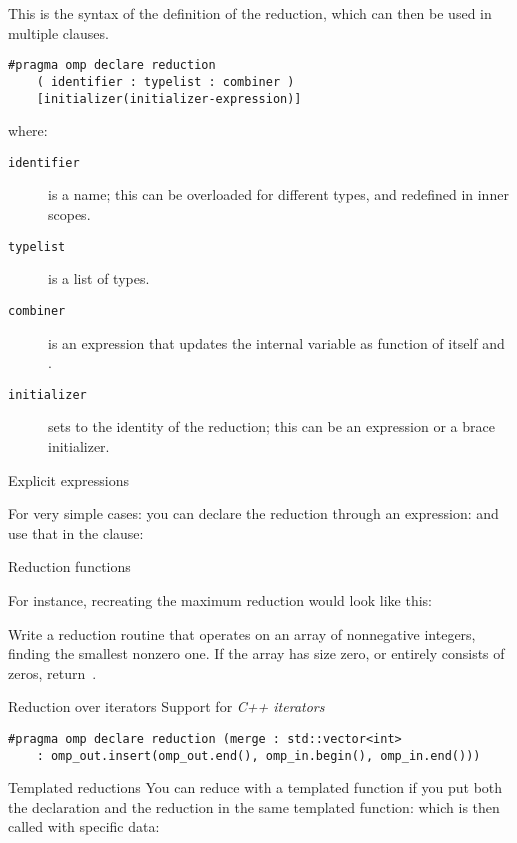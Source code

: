 This is the syntax of the definition of the reduction, which can then
be used in multiple  clauses.
\begin{lstlisting}
#pragma omp declare reduction 
    ( identifier : typelist : combiner )
    [initializer(initializer-expression)]
\end{lstlisting}
where:
\begin{description}
  \item[\texttt{identifier}] is a name; this can be overloaded for
    different types, and redefined in inner scopes.
  \item[\texttt{typelist}] is a list of types.
  \item[\texttt{combiner}] is an expression that updates the internal
    variable  as function of itself and .
  \item[\texttt{initializer}] sets  to the
    identity of the reduction; this
    can be an expression or a brace initializer.
\end{description}

 {Explicit expressions}

For very simple cases:
%
%
you can declare the reduction through an expression:
%
%
and use that in the  clause:
%

 {Reduction functions}

For instance, recreating the maximum reduction would look like this:
%

\begin{exercise}
  Write a reduction routine that operates on an array of nonnegative
  integers, finding the smallest nonzero one. If the array has size
  zero, or entirely consists of zeros, return~.
\end{exercise}

\begin{cppnote}{Reduction over iterators}
  Support for
  \emph{C++ iterators}
\begin{lstlisting}
#pragma omp declare reduction (merge : std::vector<int>
    : omp_out.insert(omp_out.end(), omp_in.begin(), omp_in.end())) 
\end{lstlisting}
\end{cppnote}

\begin{cppnote}{Templated reductions}
  You can reduce with a templated function
  if you put both the declaration and the reduction
  in the same templated function:
  which is then called with specific data:
\end{cppnote}

